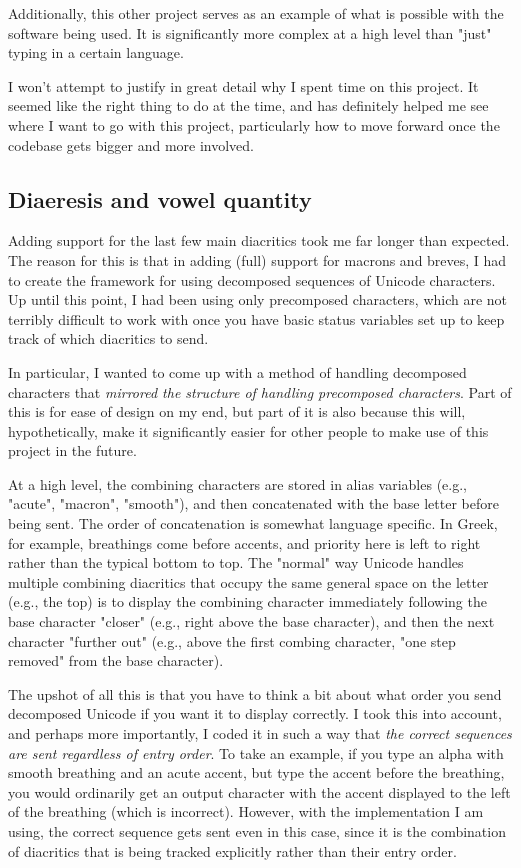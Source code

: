 \documentclass[11pt]{article}
\begin{document}
Additionally, this other project serves as an example of what is possible with the software being used. It is significantly more complex at a high level than "just" typing in a certain language.

I won't attempt to justify in great detail why I spent time on this project. It seemed like the right thing to do at the time, and has definitely helped me see where I want to go with this project, particularly how to move forward once the codebase gets bigger and more involved.

\subsection{Diaeresis and vowel quantity}
\label{sec:org01fc228}

Adding support for the last few main diacritics took me far longer than expected. The reason for this is that in adding (full) support for macrons and breves, I had to create the framework for using decomposed sequences of Unicode characters. Up until this point, I had been using only precomposed characters, which are not terribly difficult to work with once you have basic status variables set up to keep track of which diacritics to send.

In particular, I wanted to come up with a method of handling decomposed characters that \emph{mirrored the structure of handling precomposed characters}. Part of this is for ease of design on my end, but part of it is also because this will, hypothetically, make it significantly easier for other people to make use of this project in the future.

At a high level, the combining characters are stored in alias variables (e.g., "acute", "macron", "smooth"), and then concatenated with the base letter before being sent. The order of concatenation is somewhat language specific. In Greek, for example, breathings come before accents, and priority here is left to right rather than the typical bottom to top. The "normal" way Unicode handles multiple combining diacritics that occupy the same general space on the letter (e.g., the top) is to display the combining character immediately following the base character "closer" (e.g., right above the base character), and then the next character "further out" (e.g., above the first combing character, "one step removed" from the base character).

The upshot of all this is that you have to think a bit about what order you send decomposed Unicode if you want it to display correctly. I took this into account, and perhaps more importantly, I coded it in such a way that \emph{the correct sequences are sent regardless of entry order}. To take an example, if you type an alpha with smooth breathing and an acute accent, but type the accent before the breathing, you would ordinarily get an output character with the accent displayed to the left of the breathing (which is incorrect). However, with the implementation I am using, the correct sequence gets sent even in this case, since it is the combination of diacritics that is being tracked explicitly rather than their entry order.
\end{document}
